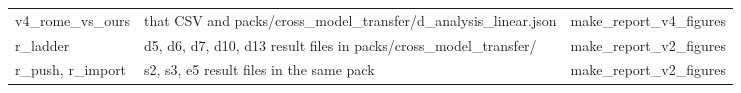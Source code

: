 \documentclass[11pt,twocolumn]{article}
\begin{document}
\begin{center}
\begin{tabular}{@{}p{}p{}p{}@{}}
v4\_\allowbreak rome\_\allowbreak vs\_\allowbreak ours & that CSV and packs/cross\_\allowbreak model\_\allowbreak transfer/d\_\allowbreak analysis\_\allowbreak linear.json & make\_\allowbreak report\_\allowbreak v4\_\allowbreak figures\\
r\_\allowbreak ladder & d5, d6, d7, d10, d13 result files in packs/cross\_\allowbreak model\_\allowbreak transfer/ & make\_\allowbreak report\_\allowbreak v2\_\allowbreak figures\\
r\_\allowbreak push, r\_\allowbreak import & s2, s3, e5 result files in the same pack & make\_\allowbreak report\_\allowbreak v2\_\allowbreak figures\\
\bottomrule
\end{tabular}
\end{center}
\end{document}
